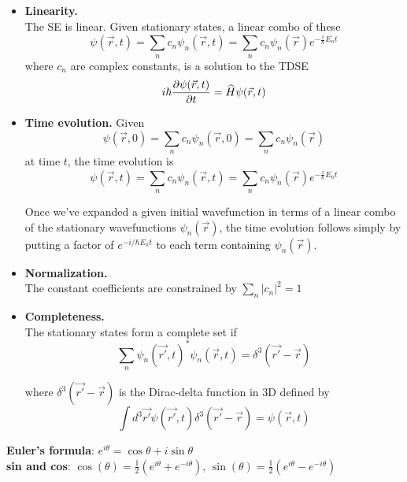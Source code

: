 \begin{itemize}[noitemsep,wide=0pt, leftmargin=\dimexpr{} + 2\relax]
    \item \textbf{Linearity.} \\
        The SE is linear. Given stationary states, a linear combo of these
            $$\psi(\vec{r}, t) = \sum_{n} c_n \psi_n(\vec{r}, t) = \sum_n c_n \psi_n(\vec{r}) e^{-\frac{i}{\hbar} E_n t}$$
        where $c_n$ are complex constants, is a solution to the TDSE 
        $$i \hbar \pdv{\psi(\vec{r}, t)}{t} = \widehat{H} \psi(\vec{r}, t)$$

    \item \textbf{Time evolution.}
        Given $$\psi(\vec{r}, 0) = \sum_n c_n \psi_n(\vec{r}, 0) = \sum_n c_n \psi_n (\vec{r})$$
        at time $t$, the time evolution is 
        $$\psi(\vec{r}, t) = \sum_n c_n \psi_n(\vec{r}, t) = \sum_n c_n \psi_n(\vec{r}) e^{-\frac{i}{\hbar} E_n t}$$

        Once we've expanded a given initial wavefunction in terms of a linear combo of the stationary wavefunctions $\psi_n(\vec{r})$, the time evolution follows simply by putting a factor of $e^{-i/\hbar E_n t}$ to each term containing $\psi_n(\vec{r})$.

    \item \textbf{Normalization.} \\
        The constant coefficients are constrained by $\sum_n |c_n|^2 = 1$

    \item \textbf{Completeness.} \\
        The stationary states form a complete set if
            $$\sum_n \psi_n (\vec{r'}, t)^* \psi_{n} (\vec{r}, t) = \delta^3 (\vec{r'} - \vec{r})$$

        where $\delta^3(\vec{r'} - \vec{r})$ is the Dirac-delta function in 3D defined by $$\int d^3 \vec{r'} \psi(\vec{r'}, t) \delta^3(\vec{r'} - \vec{r}) = \psi(\vec{r}, t)$$
\end{itemize}

\textbf{Euler's formula}: $e^{i \theta} = \cos \theta + i \sin \theta$ \\
\textbf{sin and cos}: $\cos(\theta) = \frac{1}{2}(e^{i \theta} + e^{-i \theta})$, $\sin(\theta) = \frac{1}{2}(e^{i \theta} - e^{-i \theta})$ \\


